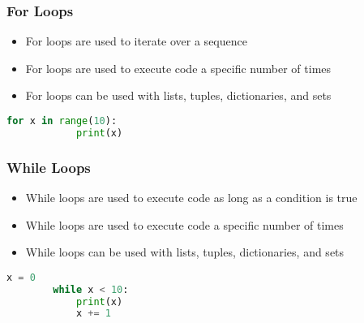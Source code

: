 \documentclass[serif, 9pt, aspectratio=32]{beamer}
\begin{document}
\begin{frame}
    \centering
    \frametitle{For Loops}
    \begin{itemize}
        \setlength{\itemsep}{3em}
        \item For loops are used to iterate over a sequence
        \item For loops are used to execute code a specific number of times
        \item For loops can be used with lists, tuples, dictionaries, and sets
    \end{itemize}
\end{frame}

\begin{frame}[fragile]
    \begin{lstlisting}[language=Python]
        for x in range(10):
            print(x)
    \end{lstlisting}
\end{frame}

\begin{frame}
    \centering
    \frametitle{While Loops}
    \begin{itemize}
        \setlength{\itemsep}{3em}
        \item While loops are used to execute code as long as a condition is true
        \item While loops are used to execute code a specific number of times
        \item While loops can be used with lists, tuples, dictionaries, and sets
    \end{itemize}
\end{frame}

\begin{frame}[fragile]
    \begin{lstlisting}[language=Python]
        x = 0
        while x < 10:
            print(x)
            x += 1
    \end{lstlisting}
\end{frame}
\end{document}
